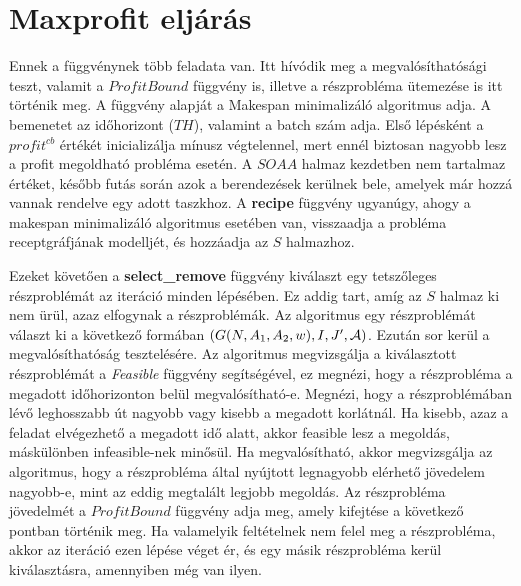 \section{Maxprofit eljárás}
Ennek a függvénynek több feladata van. Itt hívódik meg a megvalósíthatósági teszt, valamit a $ProfitBound$ függvény is, illetve a részprobléma ütemezése is itt történik meg. A függvény alapját a Makespan minimalizáló algoritmus adja. A bemenetet az időhorizont ($TH$), valamint a batch szám adja. Első lépésként a $profit^{cb}$ értékét inicializálja mínusz végtelennel, mert ennél biztosan nagyobb lesz a profit megoldható probléma esetén. A $SOAA$ halmaz kezdetben nem tartalmaz értéket, később futás során azok a berendezések kerülnek bele, amelyek már hozzá vannak rendelve egy adott taszkhoz. A \textbf{recipe} függvény ugyanúgy, ahogy a makespan minimalizáló algoritmus esetében van, visszaadja a probléma receptgráfjának modelljét, és hozzáadja az $S$ halmazhoz.

Ezeket követően a \textbf{select\_remove} függvény kiválaszt egy tetszőleges részproblémát az iteráció minden lépésében. Ez addig tart, amíg az $S$ halmaz ki nem ürül, azaz elfogynak a részproblémák. Az algoritmus egy részproblémát választ ki a következő formában $(G(N,A_1,A_2,w),I,J',{\cal A})$. Ezután sor kerül a megvalósíthatóság tesztelésére. Az algoritmus megvizsgálja a kiválasztott részproblémát a \textit{Feasible} függvény segítségével, ez megnézi, hogy a részprobléma a megadott időhorizonton belül megvalósítható-e. Megnézi, hogy a részproblémában lévő leghosszabb út nagyobb vagy kisebb a megadott korlátnál. Ha kisebb, azaz a feladat elvégezhető a megadott idő alatt, akkor feasible lesz a megoldás, máskülönben infeasible-nek minősül. Ha megvalósítható, akkor megvizsgálja az algoritmus, hogy a részprobléma által nyújtott legnagyobb elérhető jövedelem nagyobb-e, mint az eddig megtalált legjobb megoldás. Az részprobléma jövedelmét a $ProfitBound$ függvény adja meg, amely kifejtése a következő pontban történik meg. Ha valamelyik feltételnek nem felel meg a részprobléma, akkor az iteráció ezen lépése véget ér, és egy másik részprobléma kerül kiválasztásra, amennyiben még van ilyen.

